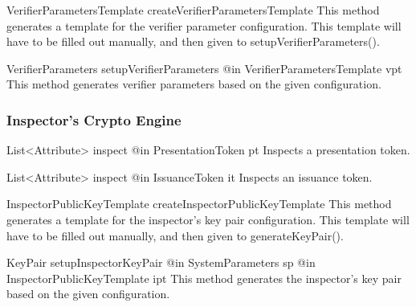       \begin{method}
      {VerifierParametersTemplate}
      {createVerifierParametersTemplate}
      {
      }
      This method generates a template for the verifier parameter configuration.
      This template will have to be filled out manually, and then given to setupVerifierParameters().
      \end{method}
      
      \begin{method}
      {VerifierParameters}
      {setupVerifierParameters}
      {
        {@in VerifierParametersTemplate vpt}
      }
      This method generates verifier parameters based on the given configuration.
      \end{method}
  
      
      



  \subsubsection{Inspector's Crypto Engine}
      
      \begin{method}
      {List<Attribute>}
      {inspect}
      {
        {@in PresentationToken pt}
      }
      Inspects a presentation token.
      \end{method}
      \begin{method}
      {List<Attribute>}
      {inspect}
      {
        {@in IssuanceToken it}
      }
      Inspects an issuance token.
      \end{method}
      \begin{method}
      {InspectorPublicKeyTemplate}
      {createInspectorPublicKeyTemplate}
      {
      }
      This method generates a template for the inspector's key pair configuration.
      This template will have to be filled out manually, and then given to generateKeyPair().
      \end{method}
      \begin{method}
      {KeyPair}
      {setupInspectorKeyPair}
      {
        {@in SystemParameters sp}
        {@in InspectorPublicKeyTemplate ipt}
      }
      This method generates the inspector's key pair based on the given configuration.
      \end{method}

